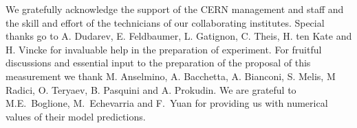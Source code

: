 \documentclass[a4paper,manyauthors,nocleardouble,COMPASS]{cernphprep}
\begin{document}
%




%
%

We gratefully acknowledge the support of the CERN management and staff and the skill and effort of the technicians of our collaborating institutes. Special thanks go to A. Dudarev, E. Feldbaumer, L. Gatignon, C. Theis, H. ten Kate and H. Vincke for invaluable help in the preparation of experiment.
For fruitful discussions and essential input to the preparation of the proposal of this measurement we thank M. Anselmino, A. Bacchetta, A. Bianconi, S. Melis, M Radici, O. Teryaev, B. Pasquini and A. Prokudin.
We are grateful to M.E.~Boglione, M.~Echevarria and F.~Yuan for providing us with numerical values of their model predictions.



%
%
%

{}
\end{document}
